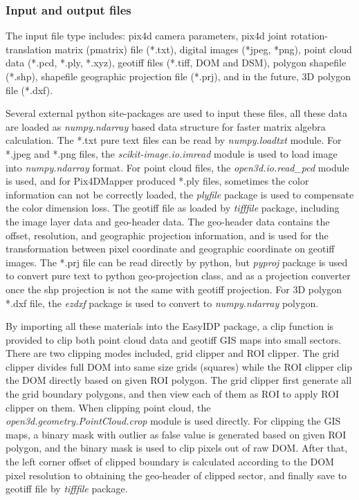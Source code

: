 \documentclass[doublespacing]{configs/bmcart}
\begin{document}
\subsubsection*{Input and output files}
The input file type includes: pix4d camera parameters, pix4d joint rotation-translation matrix (pmatrix) file (*.txt), digital images (*jpeg, *png), point cloud data (*.pcd, *.ply, *.xyz), geotiff files (*.tiff, DOM and DSM), polygon shapefile (*.shp), shapefile geographic projection file (*.prj), and in the future, 3D polygon file (*.dxf).

Several external python site-packages are used to input these files, all these data are loaded as \textit{numpy.ndarray} based data structure for faster matrix algebra calculation. The *.txt pure text files can be read by \textit{numpy.loadtxt} module. For *.jpeg and *.png files, the \textit{scikit-image.io.imread} module is used to load image into \textit{numpy.ndarray} format. For point cloud files, the \textit{open3d.io.read\_pcd} module is used, and for Pix4DMapper produced *.ply files, sometimes the color information can not be correctly loaded, the \textit{plyfile} package is used to compensate the color dimension loss. The geotiff file as loaded by \textit{tifffile} package, including the image layer data and geo-header data. The geo-header data contains the offset, resolution, and geographic projection information, and is used for the transformation between pixel coordinate and geographic coordinate on geotiff images. The *.prj file can be read directly by python, but \textit{pyproj} package is used to convert pure text to python geo-projection class, and as a projection converter once the shp projection is not the same with geotiff projection. For 3D polygon *.dxf file, the \textit{ezdxf} package is used to convert to \textit{numpy.ndarray} polygon.

By importing all these materials into the EasyIDP package, a clip function is provided to clip both point cloud data and geotiff GIS maps into small sectors. There are two clipping modes included, grid clipper and ROI clipper. The grid clipper divides full DOM into same size grids (squares) while the ROI clipper clip the DOM directly based on given ROI polygon. The grid clipper first generate all the grid boundary polygons, and then view each of them as ROI to apply ROI clipper on them. When clipping point cloud, the \textit{open3d.geometry.PointCloud.crop} module is used directly. For clipping the GIS maps, a binary mask with outlier as false value is generated based on given ROI polygon, and the binary mask is used to clip pixels out of raw DOM. After that, the left corner offset of clipped boundary is calculated according to the DOM pixel resolution to obtaining the geo-header of clipped sector, and finally save to geotiff file by \textit{tifffile} package.
\end{document}
